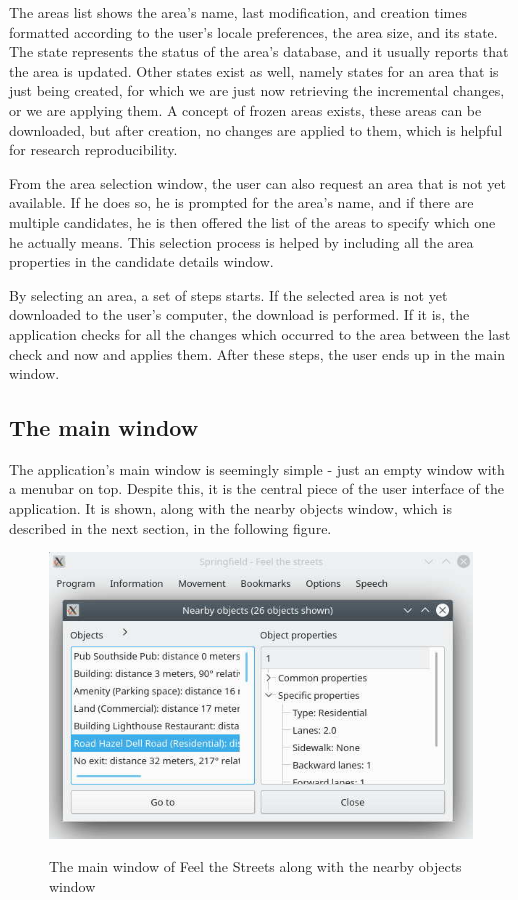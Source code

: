 \documentclass[nolof,digital]{fithesis3}
\begin{document}
The areas list shows the area's name, last modification, and creation times formatted according to the user's locale preferences, the area size, and its state. The state represents the status of the area's database, and it usually reports that the area is updated. Other states exist as well, namely states for an area that is just being created, for which we are just now retrieving the incremental changes, or we are applying them. A  concept of frozen areas exists, these areas can be downloaded, but after creation, no changes are applied to them, which is helpful for research reproducibility.

From the area selection window, the user can also request an area that is not yet available. If he does so, he is prompted for the area's name, and if there are multiple candidates, he is then offered the list of the areas to specify which one he actually means. This selection process is helped by including all the area properties in the candidate details window.

By selecting an area, a set of steps starts. If the selected area is not yet downloaded to the user's computer, the download is performed. If it is, the application checks for all the changes which occurred to the area between the last check and now and applies them. After these steps, the user ends up in the main window.
\subsection{The main window}

The application's main window is seemingly simple - just an empty window with a menubar on top. Despite this, it is the central piece of the user interface of the application. It is shown, along with the nearby objects window, which is described in the next section, in the following figure.
\begin{figure}[h]
\caption{The main window of Feel the Streets along with the nearby objects window}
\includegraphics{feel-the-streets}
\label{fig:fts}
\end{figure}
\end{document}
